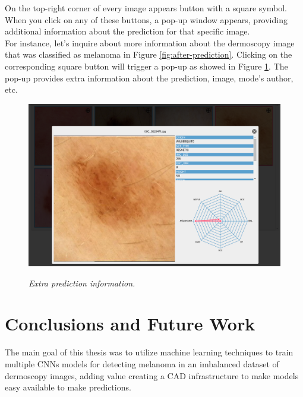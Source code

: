 On the top-right corner of every image appears button with a
square symbol. When you click on any of these buttons, a pop-up window appears,
providing additional information about the prediction for that specific image. \\

For instance, let's inquire about more information about the dermoscopy image
that was classified as melanoma in Figure \ref{fig:after-prediction}. Clicking
on the corresponding square button will trigger a pop-up as showed in Figure
\ref{fig:extra-inf-popup}. The pop-up provides extra information about the
prediction, image, mode's author, etc.

\newpage

\begin{figure}[H]
  \centering
  \begin{adjustbox}{width=0.9\textwidth, trim={0.05cm 0cm 0.25cm 0cm}, clip}
    \includegraphics[]{imatges/results/extra-inf-popup.png}
  \end{adjustbox}
  \caption[Extra prediction information]{\textit{Extra prediction information.}}
  {\label{fig:extra-inf-popup}}
\end{figure}


\section{Conclusions and Future Work}
\label{cap:concl}

The main goal of this thesis was to utilize machine learning techniques to
train multiple CNNs models for detecting melanoma in an imbalanced dataset of
dermoscopy images, adding value creating a CAD infrastructure to make models easy
available to make predictions. \\

